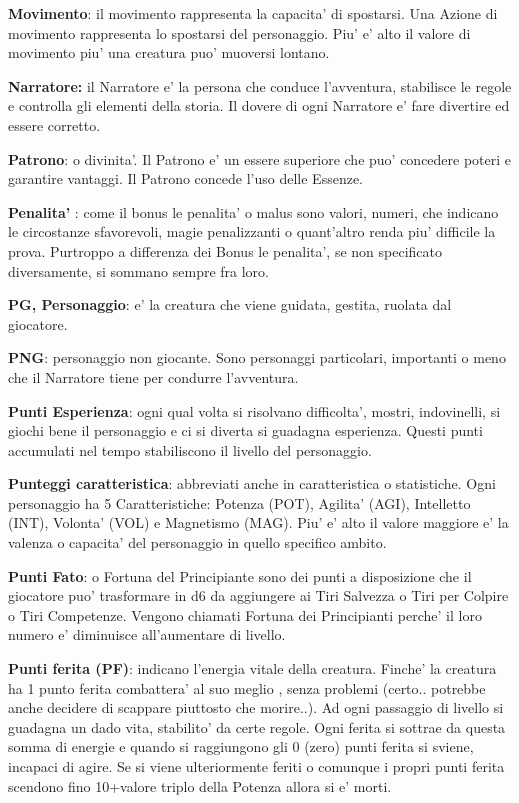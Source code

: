 \documentclass[a4paper,11pt,twoside,openany]{dndbook}
\begin{document}
\textbf{Movimento}: il movimento rappresenta la capacita' di spostarsi. Una Azione di movimento rappresenta lo spostarsi del personaggio. Piu' e' alto il valore di movimento piu' una creatura puo' muoversi lontano.

\textbf{Narratore:} il Narratore e' la persona che conduce l'avventura, stabilisce le regole e controlla gli elementi della storia. Il dovere di ogni Narratore e' fare divertire ed essere corretto.

\textbf{Patrono}: o divinita'. Il Patrono e' un essere superiore che puo' concedere poteri e garantire vantaggi. Il Patrono concede l'uso delle Essenze.

\textbf{Penalita'} : come il bonus le penalita' o malus sono valori, numeri, che indicano le circostanze sfavorevoli, magie penalizzanti o quant'altro renda piu' difficile la prova. Purtroppo a differenza dei Bonus le penalita', se non specificato diversamente, si sommano sempre fra loro. 

\textbf{PG, Personaggio}: e' la creatura che viene guidata, gestita, ruolata dal giocatore.

\textbf{PNG}: personaggio non giocante. Sono personaggi particolari, importanti o meno che il Narratore tiene per condurre l'avventura.

\textbf{Punti Esperienza}:   ogni qual volta si risolvano difficolta', mostri, indovinelli, si giochi bene il personaggio e ci si diverta si guadagna esperienza. Questi punti accumulati nel tempo stabiliscono il livello del personaggio.

\textbf{Punteggi caratteristica}: abbreviati anche in caratteristica o statistiche. Ogni personaggio ha 5 Caratteristiche: Potenza (POT), Agilita' (AGI), Intelletto (INT), Volonta' (VOL) e Magnetismo (MAG). Piu' e' alto il valore maggiore e' la valenza o capacita' del personaggio in quello specifico ambito.

\textbf{Punti Fato}: o Fortuna del Principiante sono dei punti a disposizione che il giocatore puo’ trasformare in d6 da aggiungere ai Tiri Salvezza o Tiri per Colpire o Tiri Competenze. Vengono chiamati Fortuna dei Principianti perche’ il loro numero e’ diminuisce all’aumentare di livello.

\textbf{Punti ferita (PF)}: indicano l’energia vitale della creatura. Finche’ la creatura ha 1 punto ferita combattera’ al suo meglio , senza problemi (certo.. potrebbe anche decidere di scappare piuttosto che morire..).
Ad ogni passaggio di livello si guadagna un dado vita, stabilito’ da certe regole. Ogni ferita si sottrae da questa somma di energie e quando si raggiungono gli 0 (zero) punti ferita si sviene, incapaci di agire. Se si viene ulteriormente feriti o comunque i propri punti ferita scendono fino 10+valore triplo della Potenza allora si e’ morti.
\end{document}
